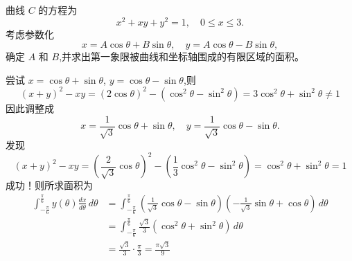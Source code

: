 \begin{questions}
    \question 曲线 $C$ 的方程为
    \[
    x^2 + xy + y^2 = 1, \quad 0 \le x \le 3.
    \]
    考虑参数化
    \[
    x = A\cos\theta + B\sin\theta, \quad y = A\cos\theta - B\sin\theta,
    \]
    确定 $A$ 和 $B$,并求出第一象限被曲线和坐标轴围成的有限区域的面积。
    \begin{solution}
        尝试 $x = \cos\theta + \sin\theta$, $y = \cos\theta - \sin\theta$,则
        \[
        (x+y)^2 - xy = (2\cos\theta)^2 - (\cos^2\theta-\sin^2\theta) 
        = 3\cos^2\theta + \sin^2\theta \neq 1
        \]
        因此调整成
        \[
        x = \frac{1}{\sqrt{3}}\cos\theta + \sin\theta, \quad y = \frac{1}{\sqrt{3}}\cos\theta - \sin\theta.
        \]
        发现
        \[
        (x+y)^2 - xy = \left(\frac{2}{\sqrt{3}}\cos\theta\right)^2 - \left(\frac{1}{3}\cos^2\theta - \sin^2\theta\right)
        = \cos^2\theta + \sin^2\theta = 1
        \]
        成功！则所求面积为
        \begin{align*}
        \int_{-\frac{\pi}{6}}^{\frac{\pi}{6}} y(\theta) \frac{dx}{d\theta}\, d\theta
        &= \int_{-\frac{\pi}{6}}^{\frac{\pi}{6}} \left(\frac{1}{\sqrt{3}}\cos\theta - \sin\theta\right)\left(-\frac{1}{\sqrt{3}}\sin\theta + \cos\theta\right)\, d\theta \\
        &= \int_{-\frac{\pi}{6}}^{\frac{\pi}{6}} \frac{\sqrt{3}}{3}(\cos^2\theta + \sin^2\theta) \, d\theta \\
        &= \frac{\sqrt{3}}{3} \cdot \frac{\pi}{3} = \frac{\pi \sqrt{3}}{9}
        \end{align*}
    \end{solution}


\end{questions}
